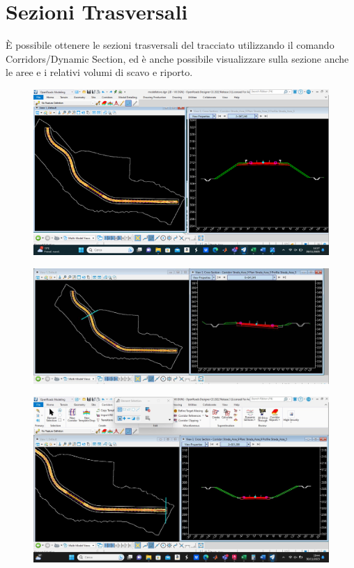 \chapter{Sezioni Trasversali}

È possibile ottenere le sezioni trasversali del tracciato utilizzando il comando Corridors/Dynamic Section, ed è anche possibile visualizzare sulla sezione anche le aree e i relativi volumi di scavo e riporto.

\begin{figure}[H]
	\centering
	\includegraphics[width=\linewidth]{Figures/Sezione in rilevato}
    \label{fig:Sezione in rilevato}
\end{figure}

\begin{figure}[H]
	\centering
	\includegraphics[width=\linewidth]{Figures/Sezione a mezzacosta}
    \label{fig:Sezione a mezzacosta}
\end{figure}

\begin{figure}[H]
	\centering
	\includegraphics[width=\linewidth]{Figures/Sezione in trincea}
    \label{fig:Sezione in trincea}
\end{figure}

